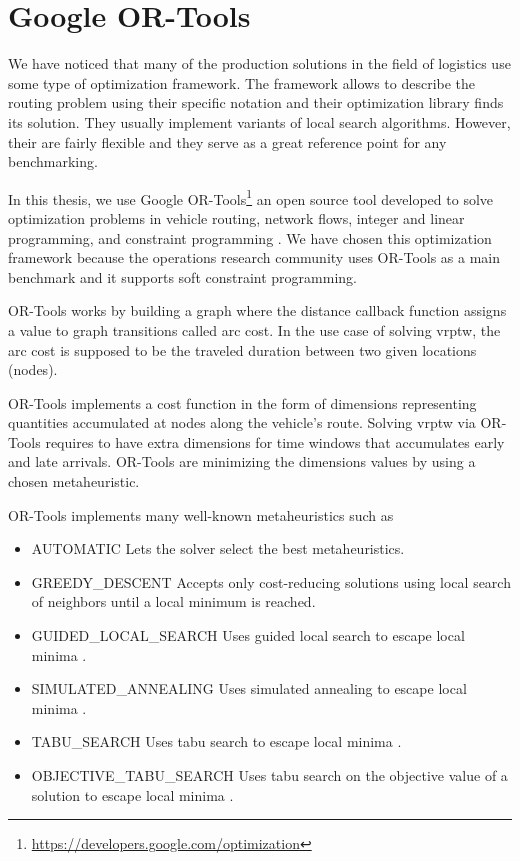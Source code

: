 \section{Google OR-Tools}\label{or-tools}
We have noticed that many of the production solutions in the field of logistics use some type of optimization framework. The framework allows to describe the routing problem using their specific notation and their optimization library finds its solution. They usually implement variants of local search algorithms. However, their are fairly flexible and they serve as a great reference point for any benchmarking.

In this thesis, we use Google OR-Tools\footnote{\url{https://developers.google.com/optimization}} an open source tool developed to solve optimization problems in vehicle routing, network flows, integer and linear programming, and constraint programming \cite{ortools}. We have chosen this optimization framework because the operations research community uses OR-Tools as a main benchmark and it supports soft constraint programming.

OR-Tools works by building a graph where the distance callback function assigns a value to graph transitions called arc cost. In the use case of solving \gls{vrptw}, the arc cost is supposed to be the traveled duration between two given locations (nodes). 

OR-Tools implements a cost function in the form of dimensions representing quantities accumulated at nodes along the vehicle's route. Solving \gls{vrptw} via OR-Tools requires to have extra dimensions for time windows that accumulates early and late arrivals. OR-Tools are minimizing the dimensions values by using a chosen metaheuristic. 

OR-Tools implements many well-known metaheuristics such as
\begin{itemize}
        \item AUTOMATIC Lets the solver select the best metaheuristics.
        \item GREEDY\_DESCENT Accepts only cost-reducing solutions using local search of neighbors until a local minimum is reached.
        \item GUIDED\_LOCAL\_SEARCH Uses guided local search to escape local minima \cite{guided-local-search}.
        \item SIMULATED\_ANNEALING Uses simulated annealing to escape local minima \cite{simulated-annealing}.
        \item TABU\_SEARCH Uses tabu search to escape local minima \cite{tabu-search}.
        \item OBJECTIVE\_TABU\_SEARCH Uses tabu search on the objective value of a solution to escape local minima \cite{objective-tabu-search}.
\end{itemize}

